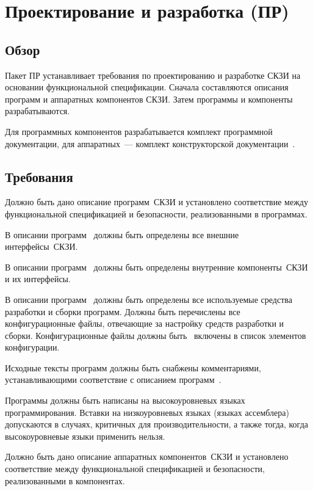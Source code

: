 \section{Проектирование и разработка (ПР)}\label{DI}

\subsection{Обзор}\label{DI.Intro}

Пакет ПР устанавливает требования по проектированию и разработке СКЗИ
на основании функциональной спецификации.
%
Сначала составляются описания программ и аппаратных компонентов СКЗИ.
Затем программы и компоненты разрабатываются.

Для программных компонентов разрабатывается комплект программной 
документации, для аппаратных~--- комплект конструкторской 
документации~.

\subsection{Требования}\label{DI.Reqs}

\label{R.DI.ProgSpec}
Должно быть дано описание программ~СКЗИ и установлено соответствие 
между функциональной спецификацией и  безопасности,
реализованными в программах.


\label{R.DI.HLD}
В описании программ~
должны быть определены все внешние интерфейсы~СКЗИ.

\label{R.DI.LLD}
В описании программ~
должны быть определены внутренние компоненты~СКЗИ и их интерфейсы.

\label{R.DI.Tools}
В описании программ~
должны быть определены все используемые средства разработки
и сборки программ. Должны быть перечислены все конфигурационные файлы,
отвечающие за настройку средств разработки и сборки. 
Конфигурационные файлы должны быть~ включены в список 
элементов конфигурации.

\label{R.DI.Comments}
Исходные тексты программ должны быть снабжены комментариями,
устанавливающими соответствие с описанием программ~.

\label{R.DI.Language}
Программы должны быть написаны на высокоуровневых языках программирования.
Вставки на низкоуровневых языках (языках ассемблера)
допускаются в случаях, критичных для производительности, 
а также тогда, когда высокоуровневые языки применить нельзя.

\label{R.DI.HardSpec}
Должно быть дано описание аппаратных компонентов~СКЗИ и установлено соответствие 
между функциональной спецификацией и  безопасности,
реализованными в компонентах.

